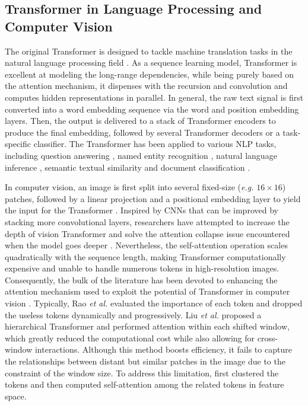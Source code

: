\documentclass[lettersize,journal]{IEEEtran}
\begin{document}
\subsection{Transformer in Language Processing and Computer Vision}
The original Transformer is designed to tackle machine translation tasks in the natural language processing field \cite{Transformer}. As a sequence learning model, Transformer is excellent at modeling the long-range dependencies, while being purely based on the attention mechanism, it dispenses with the recursion and convolution and computes hidden representations in parallel. In general, the raw text signal is first converted into a word embedding sequence via the word and position embedding layers. Then, the output is delivered to a stack of Transformer encoders to produce the final embedding, followed by several Transformer decoders or a task-specific classifier. The Transformer has been applied to various NLP tasks, including question answering \cite{TASLP_QA}, named entity recognition \cite{nlp_use_trans_ner3}, natural language inference \cite{nlp_use_trans_nli1}, semantic textual similarity \cite{TASLP_sentence_embedding} and document classification \cite{nlp_use_trans_dc3}. 

In computer vision, an image is first split into several fixed-size (\textit{e.g.} $16\times16$) patches, followed by a linear projection and a positional embedding layer to yield the input for the Transformer \cite{ViT}. Inspired by CNNs that can be improved by stacking more convolutional layers, researchers have attempted to increase the depth of vision Transformer and solve the attention collapse issue encountered when the model goes deeper \cite{deepvit}. Nevertheless, the self-attention operation scales quadratically with the sequence length, making Transformer computationally expensive and unable to handle numerous tokens in high-resolution images. Consequently, the bulk of the literature has been devoted to enhancing the attention mechanism used to exploit the potential of Transformer in computer vision \cite{Swin, cluster_vit, cluster_CVPR, ViT2, drop_vit}. Typically, Rao \textit{et al.} \cite{drop_vit} evaluated the importance of each token and dropped the useless tokens dynamically and progressively. Liu\textit{ et al.} \cite{Swin} proposed a hierarchical Transformer and performed attention within each shifted window, which greatly reduced the computational cost while also allowing for cross-window interactions. Although this method boosts efficiency, it fails to capture the relationships between distant but similar patches in the image due to the constraint of the window size. To address this limitation, \cite{cluster_vit} first clustered the tokens and then computed self-attention among the related tokens in feature space. 
\end{document}
